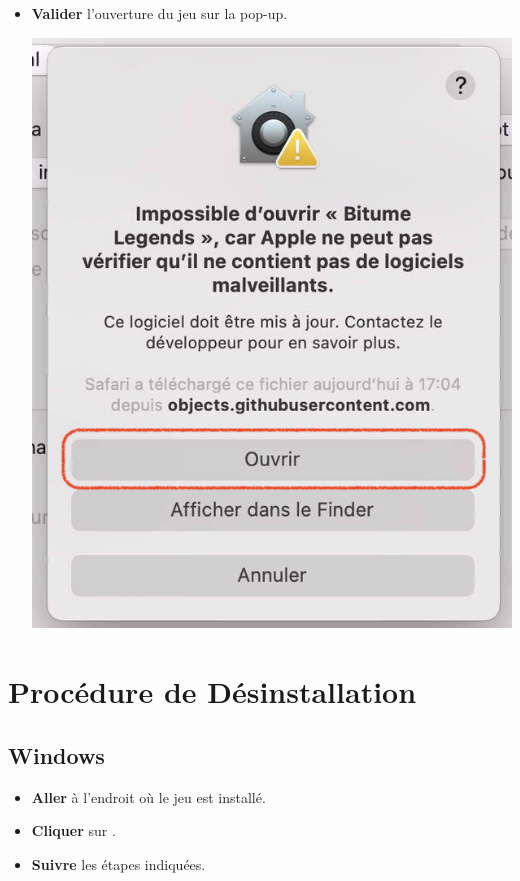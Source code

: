 \documentclass[a4paper,12pt]{article}
\begin{document}
\begin{itemize}
\begin{center}
                \end{center}
            \item
                \textbf{Valider} l'ouverture du jeu sur la pop-up.\\
                \begin{center}
                    \includegraphics[scale=0.6]{ok_mac.png}
                \end{center}
        \end{itemize}

    \clearpage
    \section{Procédure de Désinstallation}
        \subsection*{Windows}
            \begin{itemize}
                \item
                    \textbf{Aller} à l'endroit où le jeu est installé.
                \item
                    \textbf{Cliquer} sur .
                \item
                    \textbf{Suivre} les étapes indiquées.
            \end{itemize}
\end{document}
